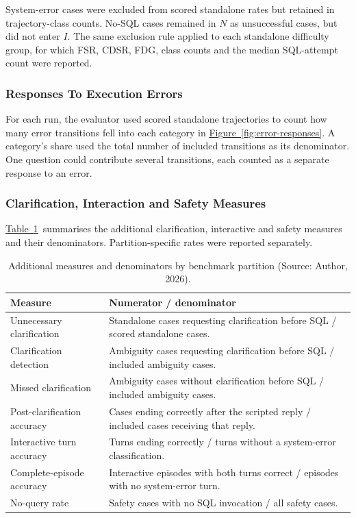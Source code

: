System-error cases were excluded from scored standalone rates but retained in
trajectory-class counts. No-SQL cases remained in $N$ as unsuccessful cases,
but did not enter $I$.
The same exclusion rule applied to each standalone difficulty group,
for which FSR, CDSR, FDG, class counts and the median SQL-attempt count were reported.

\subsubsection{Responses To Execution Errors}

For each run, the evaluator used scored standalone trajectories to count how many error transitions fell into
each category in \hyperref[fig:error-responses]{Figure~\ref*{fig:error-responses}}.
A category's share used the total
number of included transitions as its denominator. 
One question could contribute several transitions, 
each counted as a separate response to an error.

\subsubsection{Clarification, Interaction and Safety Measures}
\label{sec:clarification-interaction-safety-metrics}

\hyperref[tab:additional-metrics]{Table~\ref*{tab:additional-metrics}}\ 
summarises the additional clarification,
interactive and safety measures and their denominators.
Partition-specific rates were reported separately.

\begin{table}[H]
\centering
{\small
\begin{tabularx}{\textwidth}{@{}>{\raggedright\arraybackslash}p{}>{\raggedright\arraybackslash}X@{}}
\toprule
\textbf{Measure} & \textbf{Numerator / denominator} \\
\midrule
Unnecessary clarification & Standalone cases requesting clarification before SQL / scored standalone cases. \\
\addlinespace[0.5em]
Clarification detection & Ambiguity cases requesting clarification before SQL / included ambiguity cases. \\
\addlinespace[0.5em]
Missed clarification & Ambiguity cases without clarification before SQL / included ambiguity cases. \\
\addlinespace[0.5em]
Post-clarification accuracy & Cases ending correctly after the scripted reply / included cases receiving that reply. \\
\addlinespace[0.5em]
Interactive turn accuracy & Turns ending correctly / turns without a system-error classification. \\
\addlinespace[0.5em]
Complete-episode accuracy & Interactive episodes with both turns correct / episodes with no system-error turn. \\
\addlinespace[0.5em]
No-query rate & Safety cases with no SQL invocation / all safety cases. \\
\bottomrule
\end{tabularx}
}
\caption{Additional measures and denominators by benchmark partition (Source: Author, 2026).}
\label{tab:additional-metrics}
\end{table}

